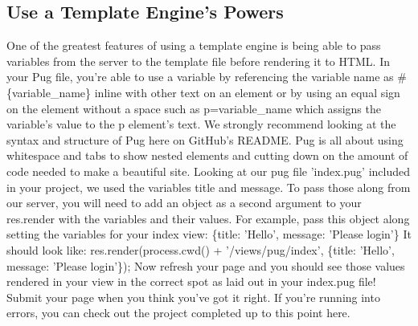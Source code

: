 \documentclass{article}%
\begin{document}
\subsection{Use a Template Engine's Powers}%
\label{subsec:UseaTemplateEnginesPowers}%
One of the greatest features of using a template engine is being able to pass variables from the server to the template file before rendering it to HTML.\newline%
In your Pug file, you're able to use a variable by referencing the variable name as \#\{variable\_name\} inline with other text on an element or by using an equal sign on the element without a space such as p=variable\_name which assigns the variable's value to the p element's text.\newline%
We strongly recommend looking at the syntax and structure of Pug here on GitHub's README. Pug is all about using whitespace and tabs to show nested elements and cutting down on the amount of code needed to make a beautiful site.\newline%
Looking at our pug file 'index.pug' included in your project, we used the variables title and message.\newline%
To pass those along from our server, you will need to add an object as a second argument to your res.render with the variables and their values. For example, pass this object along setting the variables for your index view: \{title: 'Hello', message: 'Please login'\}\newline%
It should look like: res.render(process.cwd() + '/views/pug/index', \{title: 'Hello', message: 'Please login'\});\newline%
Now refresh your page and you should see those values rendered in your view in the correct spot as laid out in your index.pug file!\newline%
Submit your page when you think you've got it right. If you're running into errors, you can check out the project completed up to this point here.\newline%

%
\end{document}
